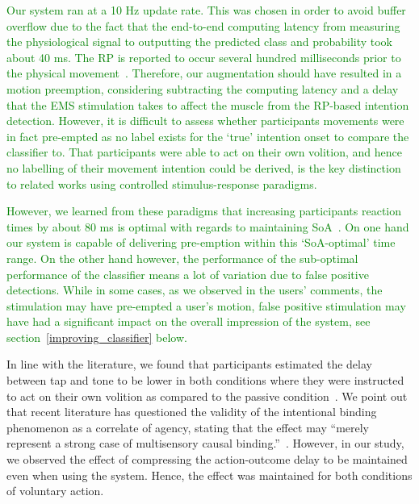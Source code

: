\textcolor{green}{Our system ran at a 10 Hz update rate. This was chosen in order to avoid buffer overflow due to the fact that the end-to-end computing latency from measuring the physiological signal to outputting the predicted class and probability took about 40 ms. The RP is reported to occur several hundred milliseconds prior to the physical movement~\cite{Schurger2021-vp}. Therefore, our augmentation should have resulted in a motion preemption, considering subtracting the computing latency and a delay that the EMS stimulation takes to affect the muscle from the RP-based intention detection. However, it is difficult to assess whether participants movements were in fact pre-empted as no label exists for the `true' intention onset to compare the classifier to. That participants were able to act on their own volition, and hence no labelling of their movement intention could be derived, is the key distinction to related works using controlled stimulus-response paradigms.}

\textcolor{green}{However, we learned from these paradigms that increasing participants reaction times by about 80 ms is optimal with regards to maintaining SoA~\cite{Kasahara2019-sk}. On one hand our system is capable of delivering pre-emption within this `SoA-optimal' time range. On the other hand however, the performance of the sub-optimal performance of the classifier means a lot of variation due to false positive detections. While in some cases, as we observed in the users' comments, the stimulation may have pre-empted a user's motion, false positive stimulation may have had a significant impact on the overall impression of the system, see section~\ref{improving_classifier} below.}

In line with the literature, we found that participants estimated the delay between tap and tone to be lower in both conditions where they were instructed to act on their own volition as compared to the passive condition~\cite{Moore2012-dk}. We point out that recent literature has questioned the validity of the intentional binding phenomenon as a correlate of agency, stating that the effect may ``merely represent a strong case of multisensory causal binding.''~\cite{Suzuki2019-pi, Gutzeit2023-ei, Hoerl2020-my}. However, in our study, we observed the effect of compressing the action-outcome delay to be maintained even when using the system. Hence, the effect was maintained for both conditions of voluntary action.

